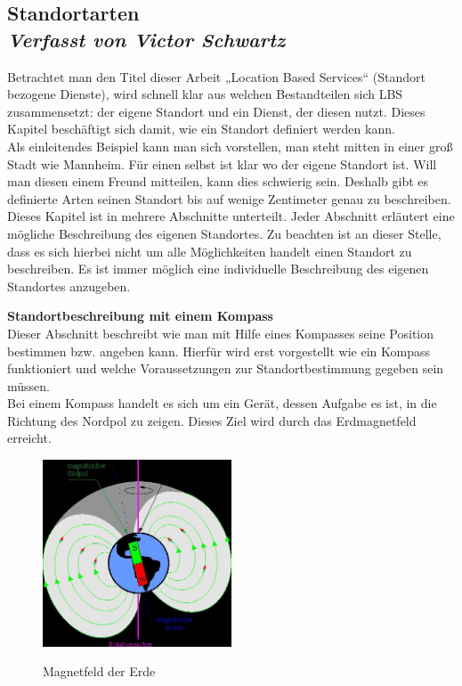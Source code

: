 \subsection[Standortarten]{Standortarten
 \\ \textnormal{\small{\textit {Verfasst von Victor Schwartz}}}}

Betrachtet man den Titel dieser Arbeit „Location Based Services“ (Standort bezogene Dienste), wird schnell klar aus welchen Bestandteilen sich LBS zusammensetzt: der eigene Standort und ein Dienst, der diesen nutzt. Dieses Kapitel beschäftigt sich damit, wie ein Standort definiert werden kann.
\\Als einleitendes Beispiel kann man sich vorstellen, man steht mitten in einer groß Stadt wie Mannheim. Für einen selbst ist klar wo der eigene Standort ist. Will man diesen einem Freund mitteilen, kann dies schwierig sein. Deshalb gibt es definierte Arten seinen Standort bis auf wenige Zentimeter genau zu beschreiben. Dieses Kapitel ist in mehrere Abschnitte unterteilt. Jeder Abschnitt erläutert eine mögliche Beschreibung des eigenen Standortes.
Zu beachten ist an dieser Stelle, dass es sich hierbei nicht um alle Möglichkeiten handelt einen Standort zu beschreiben. Es ist immer möglich eine individuelle Beschreibung des eigenen Standortes anzugeben. 

\textbf{Standortbeschreibung mit einem Kompass}
\\Dieser Abschnitt beschreibt wie man mit Hilfe eines Kompasses seine Position bestimmen bzw. angeben kann. Hierfür wird erst vorgestellt wie ein Kompass funktioniert und welche Voraussetzungen zur Standortbestimmung gegeben sein müssen.
\\Bei einem Kompass handelt es sich um ein Gerät, dessen Aufgabe es ist, in die Richtung des Nordpol zu zeigen. Dieses Ziel wird durch das Erdmagnetfeld erreicht.


\begin{figure}[ht]
  \centering
    \includegraphics[width=0.50\textwidth]{ref/images/magnetfeld.jpg}
   \caption{Magnetfeld der Erde}
  \label{fig:Magnetfeld}
  \cite{Magnetfeld}
\end{figure}



